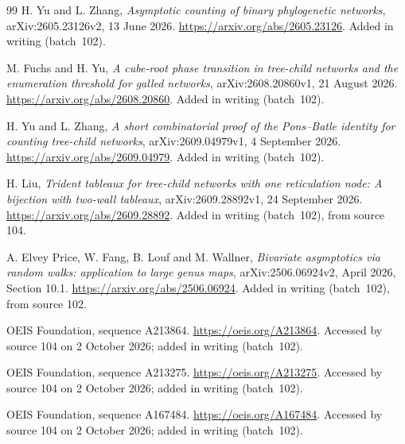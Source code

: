 \documentclass[11pt,letterpaper]{article}
\theoremstyle{remark}
\begin{document}
\begin{thebibliography}{99}
H. Yu and L. Zhang,
\emph{Asymptotic counting of binary phylogenetic networks},
arXiv:2605.23126v2, 13 June 2026.
\url{https://arxiv.org/abs/2605.23126}. Added in writing (batch~102).

M. Fuchs and H. Yu,
\emph{A cube-root phase transition in tree-child networks and the enumeration threshold for galled networks},
arXiv:2608.20860v1, 21 August 2026.
\url{https://arxiv.org/abs/2608.20860}. Added in writing (batch~102).

H. Yu and L. Zhang,
\emph{A short combinatorial proof of the Pons--Batle identity for counting tree-child networks},
arXiv:2609.04979v1, 4 September 2026.
\url{https://arxiv.org/abs/2609.04979}. Added in writing (batch~102).

H. Liu,
\emph{Trident tableaux for tree-child networks with one reticulation node: A bijection with two-wall tableaux},
arXiv:2609.28892v1, 24 September 2026.
\url{https://arxiv.org/abs/2609.28892}. Added in writing (batch~102), from source 104.

A. Elvey Price, W. Fang, B. Louf and M. Wallner,
\emph{Bivariate asymptotics via random walks: application to large genus maps},
arXiv:2506.06924v2, April 2026, Section 10.1.
\url{https://arxiv.org/abs/2506.06924}. Added in writing (batch~102), from source 102.

OEIS Foundation, sequence A213864.
\url{https://oeis.org/A213864}. Accessed by source 104 on 2 October 2026; added in writing (batch~102).

OEIS Foundation, sequence A213275.
\url{https://oeis.org/A213275}. Accessed by source 104 on 2 October 2026; added in writing (batch~102).

OEIS Foundation, sequence A167484.
\url{https://oeis.org/A167484}. Accessed by source 104 on 2 October 2026; added in writing (batch~102).
\end{thebibliography}
\end{document}
